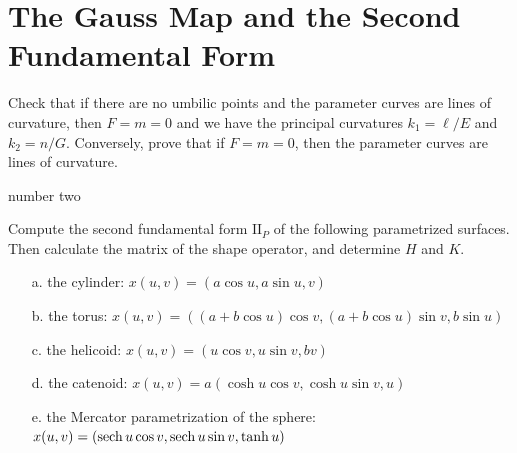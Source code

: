 \documentclass[Shifrin_Solutions_Spring_2015]{subfiles}
\begin{document}
\section{The Gauss Map and the Second Fundamental Form}

\begin{exercise}
Check that if there are no umbilic points and the parameter curves are lines of curvature, then $F = m = 0$ and we have the principal curvatures $k_1 = \ell/E$ and $k_2 = n/G$. Conversely, prove that if $F =m =0$, then the parameter curves are lines of curvature.
\end{exercise}

\begin{exercise} number two

\end{exercise}

\begin{exercise} Compute the second fundamental form $\mathrm{II}_P$ of the following parametrized surfaces. Then calculate the matrix of the shape operator, and determine $H$ and $K$.
\begin{itemize}
\item[a.] the cylinder: $x(u,v) = \left( a \cos u , a \sin u , v \right) $
\item[b.] the torus: $x(u,v) = \left ( (a+b\cos u) \cos v, (a+b\cos u) \sin v , b \sin u \right) $
\item[c.] the helicoid: $x(u,v) = \left( u\cos v , u \sin v , b v \right) $
\item[d.] the catenoid: $x(u,v) = a\left( \cosh u \cos v, \cosh u\sin v, u \right) $
\item[e.] the Mercator parametrization of the sphere: $x(u,v) = \left( \operatorname{\mathrm{sech}} u \cos v , \operatorname{\mathrm{sech}} u \sin v, \tanh u \right) $
\end{itemize}
\end{exercise}
\end{document}
